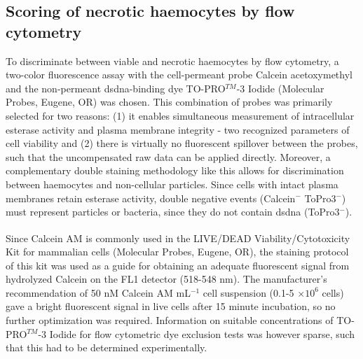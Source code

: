 \subsection{Scoring of necrotic haemocytes by flow cytometry}
To discriminate between viable and necrotic haemocytes by flow cytometry, a two-color fluorescence assay with the cell-permeant probe Calcein acetoxymethyl and the non-permeant \acrshort{dsdna}-binding dye TO-PRO$^{TM}$-3 Iodide (Molecular Probes, Eugene, OR) was chosen. This combination of probes was primarily selected for two reasons: (1) it enables simultaneous measurement of intracellular esterase activity and plasma membrane integrity - two recognized parameters of cell viability and (2) there is virtually no fluorescent spillover between the probes, such that the uncompensated raw data can be applied directly. Moreover, a complementary double staining methodology like this allows for discrimination between haemocytes and non-cellular particles. Since cells with intact plasma membranes retain esterase activity, double negative events (Calcein$^{-}$ ToPro3$^{-}$) must represent particles or bacteria, since they do not contain \acrshort{dsdna} (ToPro3$^{-}$). 

Since Calcein AM is commonly used in the LIVE/DEAD\textsuperscript{\textregistered} Viability/Cytotoxicity Kit for mammalian cells (Molecular Probes, Eugene, OR), the staining protocol of this kit was used as a guide for obtaining an adequate fluorescent signal from hydrolyzed Calcein on the FL1 detector (518-548 nm). The manufacturer's recommendation of 50 nM Calcein AM mL$^{-1}$ cell suspension (0.1-5 $\times 10^{6}$ cells) gave a bright fluorescent signal in live cells after 15 minute incubation, so no further optimization was required. Information on suitable concentrations of TO-PRO$^{TM}$-3 Iodide for flow cytometric dye exclusion tests was however sparse, such that this had to be determined experimentally.

